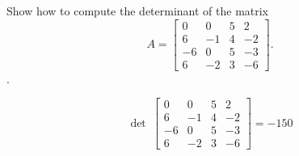 
\begin{exerciseStatement}


Show how to compute the determinant of the matrix \[A= \left[\begin{array}{cccc}
0 & 0 & 5 & 2 \\
6 & -1 & 4 & -2 \\
-6 & 0 & 5 & -3 \\
6 & -2 & 3 & -6
\end{array}\right] .\].


\end{exerciseStatement}
    
\begin{exerciseAnswer} 
\[\operatorname{det}\  \left[\begin{array}{cccc}
0 & 0 & 5 & 2 \\
6 & -1 & 4 & -2 \\
-6 & 0 & 5 & -3 \\
6 & -2 & 3 & -6
\end{array}\right] = -150 \]
\end{exerciseAnswer}
    
